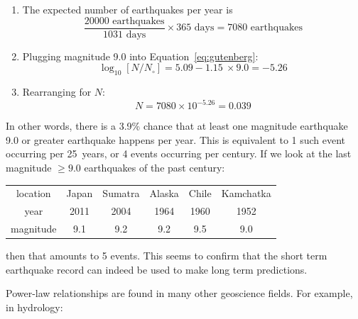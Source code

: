 \begin{enumerate}
\item The expected number of earthquakes per year is
  \[
  \frac{20000\mbox{~earthquakes}}{1031\mbox{~days}}\times{365}\mbox{~days}
  = 7080 \mbox{~earthquakes}
  \]

\item Plugging magnitude 9.0 into Equation~\ref{eq:gutenberg}:
  \[
  \log_{10}[N/N_\circ] = 5.09 -1.15~\times{9.0} = -5.26
  \]

\item Rearranging for $N$:
  \[
  N = 7080 \times 10^{-5.26} = 0.039
  \]
\end{enumerate}

In other words, there is a 3.9\% chance that at least one magnitude
earthquake 9.0 or greater earthquake happens per year. This is
equivalent to 1 such event occurring per 25~years, or 4 events
occurring per century. If we look at the last magnitude $\geq{9.0}$
earthquakes of the past century:

\begin{center}
  \begin{tabular}{c|ccccc}
    location & Japan & Sumatra & Alaska & Chile & Kamchatka \\
    year & 2011 & 2004 & 1964 & 1960 & 1952 \\
    magnitude & 9.1 & 9.2 & 9.2 & 9.5 & 9.0
  \end{tabular}
\end{center}

\noindent then that amounts to 5 events. This seems to confirm that
the short term earthquake record can indeed be used to make long term
predictions.\medskip

Power-law relationships are found in many other geoscience fields. For
example, in hydrology:

